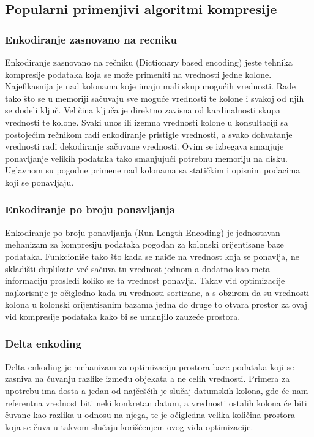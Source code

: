 \documentclass[12pt,oneside]{memoir}
\begin{document}
\subsection{Popularni primenjivi algoritmi kompresije}
\cite{ColumnarOptimizations}
\subsubsection{Enkodiranje zasnovano na recniku}

Enkodiranje zasnovano na rečniku (Dictionary based encoding) jeste tehnika kompresije podataka koja se može primeniti na vrednosti jedne kolone. Najefikasnija je nad kolonama koje imaju mali skup mogućih vrednosti. Rade tako što se u memoriji sačuvaju sve moguće vrednosti te kolone i svakoj od njih se dodeli ključ. Veličina ključa je direktno zavisna od kardinalnosti skupa vrednosti te kolone. Svaki unos ili izemna vrednosti kolone u konsultaciji sa postojećim rečnikom radi enkodiranje pristigle vrednosti, a svako dohvatanje vrednosti radi dekodiranje sačuvane vrednosti. Ovim se izbegava smanjuje ponavljanje velikih podataka tako smanjujući potrebnu memoriju na disku. Uglavnom su pogodne primene nad kolonama sa statičkim i opisnim podacima koji se ponavljaju.

\subsubsection{Enkodiranje po broju ponavljanja}

Enkodiranje po broju ponavljanja (Run Length Encoding) je jednostavan mehanizam za kompresiju podataka pogodan za kolonski orijentisane baze podataka. Funkcioniše tako što kada se naiđe na vrednost koja se ponavlja, ne skladišti duplikate već sačuva tu vrednost jednom a dodatno kao meta informaciju prosledi koliko se ta vrednost ponavlja. Takav vid optimizacije najkorisnije je očigledno kada su vrednosti sortirane, a s obzirom da su vrednosti kolona u kolonski orijentisanim bazama jedna do druge to otvara prostor za ovaj vid kompresije podataka kako bi se umanjilo zauzeće prostora.

\subsubsection{Delta enkoding}
Delta enkoding je mehanizam za optimizaciju prostora baze podataka koji se zasniva na čuvanju razlike između objekata a ne celih vrednosti. Primera za upotrebu ima dosta a jedan od najčešćih je slučaj datumskih kolona, gde će nam referentna vrednost biti neki konkretan datum, a vrednosti ostalih kolona će biti čuvane kao razlika u odnosu na njega, te je očigledna velika količina prostora koja se čuva u takvom slučaju korišćenjem ovog vida optimizacije.
\end{document}
